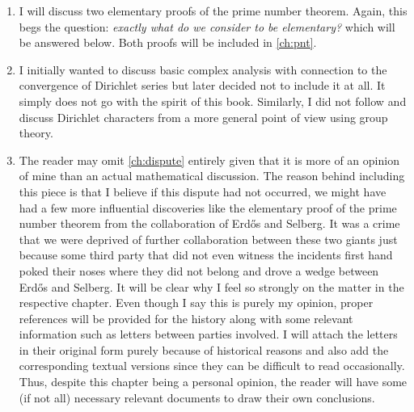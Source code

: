 \documentclass[12pt,leqno]{book}
\theoremstyle{definition}
\begin{document}
\begin{enumerate}[(1)]
			\item I will discuss two elementary proofs of the prime number theorem. Again, this begs the question: \textit{exactly what do we consider to be elementary?} which will be answered below. Both proofs will be included in \autoref{ch:pnt}.
			\item I initially wanted to discuss basic complex analysis with connection to the convergence of Dirichlet series but later decided not to include it at all. It simply does not go with the spirit of this book. Similarly, I did not follow \textcite{apostol_1976} and discuss Dirichlet characters from a more general point of view using group theory.
			\item The reader may omit \autoref{ch:dispute} entirely given that it is more of an opinion of mine than an actual mathematical discussion. The reason behind including this piece is that I believe if this dispute had not occurred, we might have had a few more influential discoveries like the elementary proof of the prime number theorem from the collaboration of Erd\H{o}s and Selberg. It was a crime that we were deprived of further collaboration between these two giants just because some third party that did not even witness the incidents first hand poked their noses where they did not belong and drove a wedge between Erd\H{o}s and Selberg. It will be clear why I feel so strongly on the matter in the respective chapter. Even though I say this is purely my opinion, proper references will be provided for the history along with some relevant information such as letters between parties involved. I will attach the letters in their original form purely because of historical reasons and also add the corresponding textual versions since they can be difficult to read occasionally. Thus, despite this chapter being a personal opinion, the reader will have some (if not all) necessary relevant documents to draw their own conclusions.
		\end{enumerate}
\end{document}
